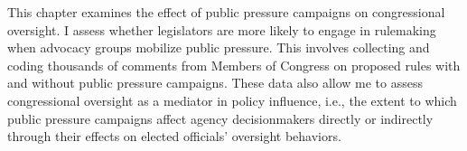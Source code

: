 This chapter examines the effect of public pressure campaigns on congressional oversight. I assess whether legislators are more likely to engage in rulemaking when advocacy groups mobilize public pressure. This involves collecting and coding thousands of comments from Members of Congress on proposed rules with and without public pressure campaigns. These data also allow me to assess congressional oversight as a mediator in policy influence, i.e., the extent to which public pressure campaigns affect agency decisionmakers directly or indirectly through their effects on elected officials’ oversight behaviors.